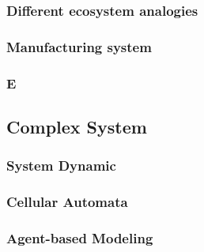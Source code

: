 \subsubsection{Different ecosystem analogies}

\subsubsection{Manufacturing system}






\subsubsection{E}


\subsection{Complex System} %
\label{sub:complex_system}
\subsubsection{System Dynamic}

\subsubsection{Cellular Automata}

\subsubsection{Agent-based Modeling}
